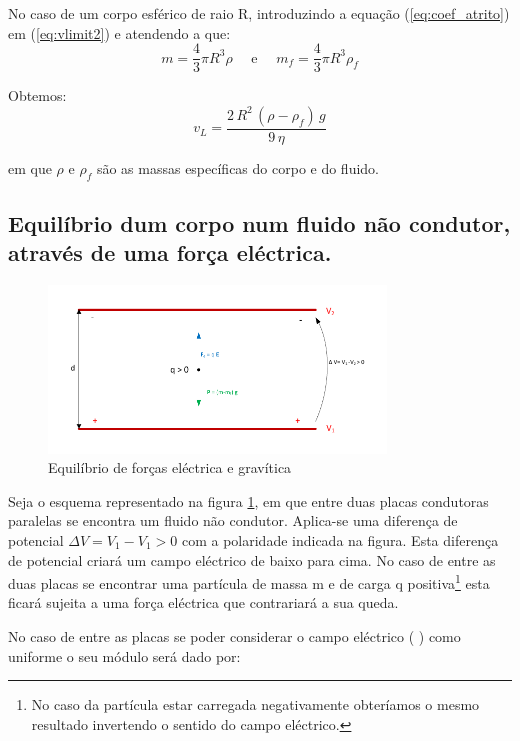 \documentclass[a4paper,twoside,12pt]{article}      %
\begin{document}
No caso de um corpo esférico de raio R, introduzindo a equação (\ref{eq:coef_atrito}) em (\ref{eq:vlimit2}) e atendendo a que:
\begin{equation*}
	m = \frac{4}{3} \pi R^3 \rho \quad \textrm{  e } \quad  m_f = \frac{4}{3} \pi R^3 \rho_f
\end{equation*}

Obtemos:
\begin{equation}
	\label{eq:vlimit3}
	v_L = \frac{2\,R^2\, (\rho - \rho_f)\,g}{9  \, \eta}
\end{equation}

em que $\rho$  e $\rho_f$ são as massas específicas do corpo e do fluido.

%
\subsection{\sf Equilíbrio dum corpo num fluido não condutor, através de uma força eléctrica.}

\begin{figure}
	[!htb]  \centering 
	\includegraphics[width=0.8\textwidth]{./F_equil}
	\caption{Equilíbrio de forças eléctrica e gravítica \label{fig:f_equil}} 
\end{figure}

Seja o esquema representado na figura \ref{fig:f_equil}, em que entre duas placas condutoras paralelas se encontra um fluido não condutor. Aplica-se uma diferença de potencial $\Delta V = V_1 -V_1 > 0$ com a polaridade indicada na figura. Esta diferença de potencial criará um campo eléctrico de baixo para cima. No caso de entre as duas placas se encontrar uma partícula de massa m e de carga q positiva\footnote{No caso da partícula estar carregada negativamente obteríamos o mesmo resultado invertendo o sentido do campo eléctrico.} esta ficará sujeita a uma força eléctrica que contrariará a sua queda.

No caso de entre as placas se poder considerar o campo eléctrico (  ) como uniforme o seu módulo será dado por:
\end{document}
